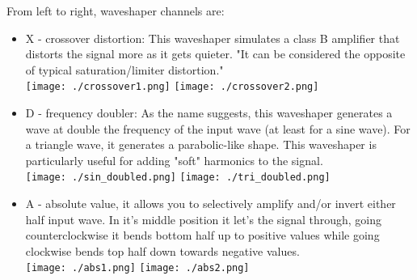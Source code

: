 \documentclass[a4paper,14pt]{extarticle}
\newlength\myboxwidth
\begin{document}
From left to right, waveshaper channels are:
\begin{itemize}
\item \textcolor{Xcolor}{X - crossover distortion}: This waveshaper simulates a class B amplifier that distorts the signal more as it gets quieter. "It can be considered the opposite of typical saturation/limiter distortion."\\
\texttt{[image: ./crossover1.png]}
\texttt{[image: ./crossover2.png]}
\item \textcolor{Dcolor}{D - frequency doubler}: As the name suggests, this waveshaper generates a wave at double the frequency of the input wave (at least for a sine wave). For a triangle wave, it generates a parabolic-like shape. This waveshaper is particularly useful for adding "soft" harmonics to the signal.\\
\texttt{[image: ./sin\_doubled.png]}
\texttt{[image: ./tri\_doubled.png]}
\item \textcolor{Acolor}{A - absolute value}, it allows you to selectively amplify and/or invert either half input wave. In it's middle position it let's the signal through, going counterclockwise it bends bottom half up to positive values while going clockwise bends top half down towards negative values.\\
\texttt{[image: ./abs1.png]}
\texttt{[image: ./abs2.png]}
\end{itemize}
\vspace{0.5cm}
\\
\vspace{0.5cm}
\\
\end{document}
